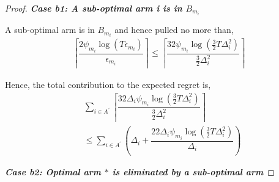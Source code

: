 \begin{proof}
\textbf{\textit{Case b1: A sub-optimal arm i is in $B_{m_i}$}}


A sub-optimal arm is in $B_{m_i}$ and hence pulled no more than,
\begin{align*}
\left\lceil \dfrac{2\psi_{m_i}\log( T\epsilon_{m_i})}{\epsilon_{m_i}} \right\rceil\leq \left\lceil \dfrac{32\psi_{m_i}\log( \frac{3}{2} T\Delta_i^2)}{\frac{3}{2} \Delta_i^2}\right\rceil
\end{align*}

Hence, the total contribution to the expected regret is,
\begin{align*}
&\sum_{i\in A^{'}} \left\lceil \dfrac{32\Delta_i\psi_{m_i}\log( \frac{3}{2} T\Delta_i^2)}{\frac{3}{2} \Delta_i^2}\right\rceil\\
&\leq \sum_{i\in A^{'}} \left( \Delta_i +\dfrac{22\Delta_i\psi_{m_i}\log( \frac{3}{2} T\Delta_i^2)}{ \Delta_i}\right)
\end{align*}

\textbf{\textit{Case b2: Optimal arm ${*}$ is eliminated by a sub-optimal arm}}


\end{proof}
